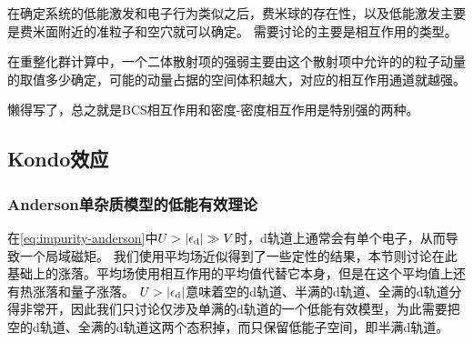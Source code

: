 \documentclass[hyperref, UTF8, a4paper]{ctexart}
\begin{document}
在确定系统的低能激发和电子行为类似之后，费米球的存在性，以及低能激发主要是费米面附近的准粒子和空穴就可以确定。
需要讨论的主要是相互作用的类型。

在重整化群计算中，一个二体散射项的强弱主要由这个散射项中允许的的粒子动量的取值多少确定，可能的动量占据的空间体积越大，对应的相互作用通道就越强。

懒得写了，总之就是BCS相互作用和密度-密度相互作用是特别强的两种。

\subsection{Kondo效应}\label{sec:kondo-effect}

\subsubsection{Anderson单杂质模型的低能有效理论}

在\eqref{eq:impurity-anderson}中$U > \abs{\epsilon_\text{d}} \gg V$时，d轨道上通常会有单个电子，从而导致一个局域磁矩。
我们使用平均场近似得到了一些定性的结果，本节则讨论在此基础上的涨落。平均场使用相互作用的平均值代替它本身，但是在这个平均值上还有热涨落和量子涨落。
$U > \abs{\epsilon_\text{d}}$意味着空的d轨道、半满的d轨道、全满的d轨道分得非常开，因此我们只讨论仅涉及单满的d轨道的一个低能有效模型，为此需要把空的d轨道、全满的d轨道这两个态积掉，而只保留低能子空间，即半满d轨道。
\end{document}
